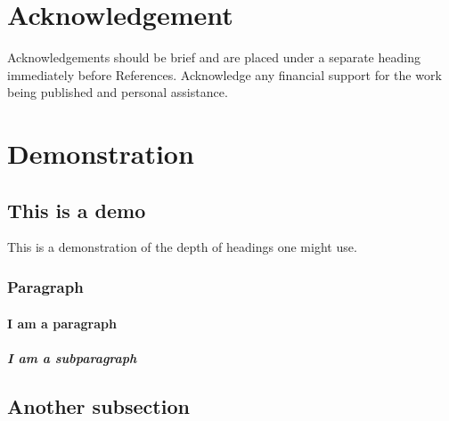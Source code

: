 \documentclass{strrespaper-journ}
\begin{document}
	\section{Acknowledgement}
		Acknowledgements should be brief and are placed under a separate heading immediately before References.
		Acknowledge any financial support for the work being published and personal assistance.

	\section{Demonstration}
		\subsection{This is a demo}
			This is a demonstration of the depth of headings one might use.
			\subsubsection{Paragraph}
				\paragraph{I am a paragraph}
					\blindtext
					\subparagraph{I am a subparagraph}
						\blindtext

		\subsection{Another subsection}
			\blindtext[2] \autocite{letcherWindEnergyEngineering2017}
			\nocite{al-shemmeriWindTurbines2010}
			\nocite{trewbyWindEnergyImplications2014}

	\printbibliography
\end{document}
